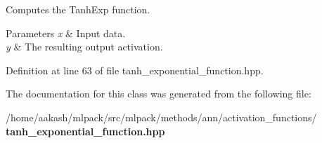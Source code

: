 Computes the Tanh\+Exp function. 


\begin{DoxyParams}{Parameters}
{\em x} & Input data. \\
\hline
{\em y} & The resulting output activation. \\
\hline
\end{DoxyParams}


Definition at line 63 of file tanh\+\_\+exponential\+\_\+function.\+hpp.



The documentation for this class was generated from the following file\+:\begin{DoxyCompactItemize}
\item 
/home/aakash/mlpack/src/mlpack/methods/ann/activation\+\_\+functions/\textbf{ tanh\+\_\+exponential\+\_\+function.\+hpp}\end{DoxyCompactItemize}
